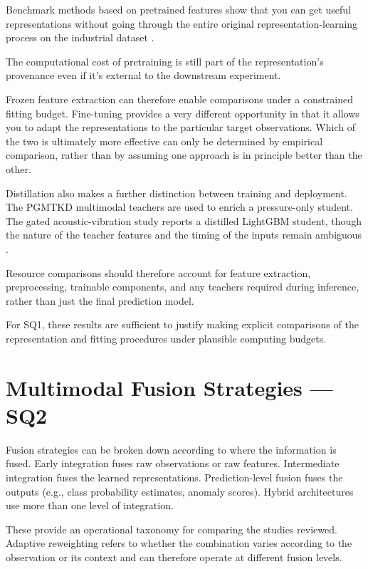 Benchmark methods based on pretrained features show that you can get useful representations without
going through the entire original representation-learning process on the industrial dataset
\parencite{Roth2022Towards,Costanzino2024Multimodal}.

The computational cost of pretraining is still part of the representation's provenance even if it's
external to the downstream experiment.

Frozen feature extraction can therefore enable comparisons under a constrained fitting budget.
Fine-tuning provides a very different opportunity in that it allows you to adapt the representations
to the particular target observations. Which of the two is ultimately more effective can only be
determined by empirical comparison, rather than by assuming one approach is in principle better than
the other.

Distillation also makes a further distinction between training and deployment. The PGMTKD multimodal
teachers are used to enrich a pressure-only student. The gated acoustic-vibration study reports a
distilled LightGBM student, though the nature of the teacher features and the timing of the inputs
remain ambiguous \parencite{Li2025PGMTKD,Huang2026Rolling}.

Resource comparisons should therefore account for feature extraction, preprocessing, trainable
components, and any teachers required during inference, rather than just the final prediction model.

For SQ1, these results are sufficient to justify making explicit comparisons of the representation
and fitting procedures under plausible computing budgets.

\section{Multimodal Fusion Strategies --- SQ2}

Fusion strategies can be broken down according to where the information is fused. Early integration
fuses raw observations or raw features. Intermediate integration fuses the learned representations.
Prediction-level fusion fuses the outputs (e.g., class probability estimates, anomaly scores).
Hybrid architectures use more than one level of integration.

These provide an operational taxonomy for comparing the studies reviewed. Adaptive reweighting
refers to whether the combination varies according to the observation or its context and can
therefore operate at different fusion levels.

